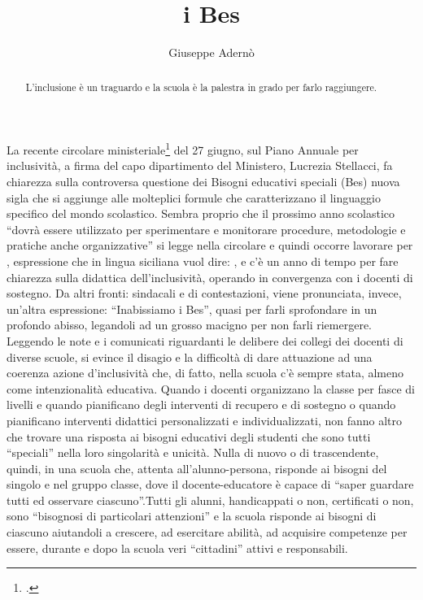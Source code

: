 \author{Giuseppe Adernò}
\title{ i Bes}
\label{cha:aderno0107013}
\begin{abstract}
L'inclusione è un traguardo e la scuola è la palestra in grado per farlo raggiungere.
\end{abstract}
\maketitle
{}
La recente circolare ministeriale\footcite{Nota_1551_2013} del 27 giugno, sul Piano Annuale per inclusività, a firma del capo dipartimento del Ministero, Lucrezia Stellacci, fa chiarezza sulla controversa questione dei Bisogni educativi speciali (Bes) nuova sigla che si aggiunge alle molteplici formule che caratterizzano il linguaggio specifico del mondo scolastico.
Sembra proprio che il prossimo anno scolastico “dovrà essere utilizzato per sperimentare e monitorare procedure, metodologie e pratiche anche organizzative” si legge nella circolare e quindi occorre lavorare per , espressione che in lingua siciliana vuol dire: , e c'è un anno di tempo per fare chiarezza sulla didattica dell'inclusività, operando in convergenza con i docenti di sostegno.
Da altri fronti: sindacali e di contestazioni, viene pronunciata, invece, un'altra espressione: “Inabissiamo i Bes”, quasi per farli sprofondare in un profondo abisso, legandoli ad un grosso macigno per non farli riemergere.
Leggendo le note e i comunicati riguardanti le delibere dei collegi dei docenti di diverse scuole, si evince il disagio e la difficoltà di dare attuazione ad una coerenza azione d'inclusività che, di fatto, nella scuola c'è sempre stata, almeno come intenzionalità educativa. Quando i docenti organizzano la classe per fasce di livelli e quando pianificano degli interventi di recupero e di sostegno o quando pianificano interventi didattici personalizzati e individualizzati, non fanno altro che trovare una risposta ai bisogni educativi degli studenti che sono tutti “speciali” nella loro singolarità e unicità.
Nulla di nuovo o di trascendente, quindi, in una scuola che, attenta all'alunno-persona, risponde ai bisogni del singolo e nel gruppo classe, dove il docente-educatore è capace di “saper guardare tutti ed osservare ciascuno”.Tutti gli alunni, handicappati o non, certificati o non, sono “bisognosi di particolari attenzioni” e la scuola risponde ai bisogni di ciascuno aiutandoli a crescere, ad esercitare abilità, ad acquisire competenze per essere, durante e dopo la scuola veri “cittadini” attivi e responsabili.
